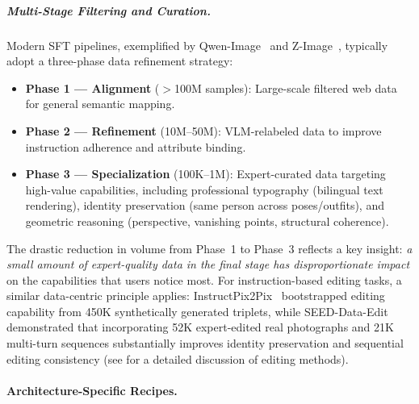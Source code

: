 \subparagraph{Multi-Stage Filtering and Curation.}
Modern SFT pipelines, exemplified by Qwen-Image~\citep{wu2025qwen} and Z-Image~\citep{cai2025z}, typically adopt a three-phase data refinement strategy:
\begin{itemize}[leftmargin=*,itemsep=2pt]
    \item \textbf{Phase 1 --- Alignment} ($>$100M samples): Large-scale filtered web data for general semantic mapping.
    \item \textbf{Phase 2 --- Refinement} (10M--50M): VLM-relabeled data to improve instruction adherence and attribute binding.
    \item \textbf{Phase 3 --- Specialization} (100K--1M): Expert-curated data targeting high-value capabilities, including professional typography (bilingual text rendering), identity preservation (same person across poses/outfits), and geometric reasoning (perspective, vanishing points, structural coherence).
\end{itemize}
The drastic reduction in volume from Phase~1 to Phase~3 reflects a key insight: \emph{a small amount of expert-quality data in the final stage has disproportionate impact} on the capabilities that users notice most. For instruction-based editing tasks, a similar data-centric principle applies: InstructPix2Pix~\citep{brooks2023instructpix2pix} bootstrapped editing capability from 450K synthetically generated triplets, while SEED-Data-Edit~\citep{ge2024seed} demonstrated that incorporating 52K expert-edited real photographs and 21K multi-turn sequences substantially improves identity preservation and sequential editing consistency (see  for a detailed discussion of editing methods).

\paragraph{Architecture-Specific Recipes.}

